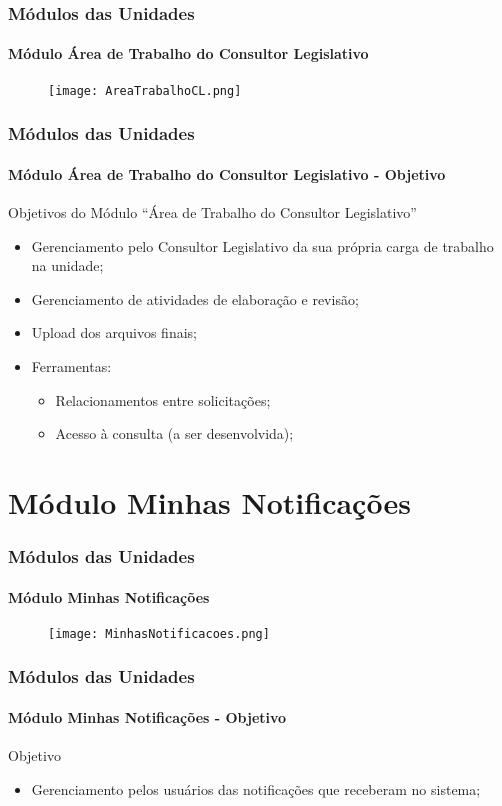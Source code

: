 \begin{frame}
	\frametitle{Módulos das Unidades}
	\framesubtitle{Módulo Área de Trabalho do Consultor Legislativo}
	\begin{figure}
		\texttt{[image: AreaTrabalhoCL.png]}
	\end{figure}
\end{frame}
\begin{frame}
	\frametitle{Módulos das Unidades}
	\framesubtitle{Módulo Área de Trabalho do Consultor Legislativo - Objetivo}
	
	\begin{exampleblock}{Objetivos do Módulo ``Área de Trabalho do Consultor Legislativo''} 
		\begin{itemize}
			\item Gerenciamento pelo Consultor Legislativo da sua própria carga de trabalho na unidade;
			\item Gerenciamento de atividades de elaboração e revisão;
			\item Upload dos arquivos finais;
			\item Ferramentas:
			\begin{itemize}
				\item Relacionamentos entre solicitações;
				\item Acesso à consulta (a ser desenvolvida);
			\end{itemize}
			
		\end{itemize}
	\end{exampleblock}
\end{frame}
\section{Módulo Minhas Notificações}

\begin{frame}
	\frametitle{Módulos das Unidades}
	\framesubtitle{Módulo Minhas Notificações}
	\begin{figure}
		\texttt{[image: MinhasNotificacoes.png]}
	\end{figure}
\end{frame}
\begin{frame}
	\frametitle{Módulos das Unidades}
	\framesubtitle{Módulo Minhas Notificações - Objetivo}
	
	\begin{exampleblock}{Objetivo} 
		\begin{itemize}
			\item Gerenciamento pelos usuários das notificações que receberam no sistema;
		\end{itemize}
	\end{exampleblock}
\end{frame}

